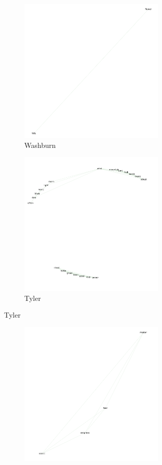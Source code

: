 \documentclass[12pt]{article}
\begin{document}
\begin{flushleft}
\begin{spacing}{2.0}
\begin{figure}
	\begin{subfigure}{\linewidth}
		\begin{subfigure}{.5\linewidth}
	  		\includegraphics[width=3in]{washburn-no-womenwords.png}\hfill
	  		\caption{Washburn}
	  	\end{subfigure}
	  	\begin{subfigure}{.5\linewidth}
	  		\includegraphics[width=3in]{tyler-no-womenwords.png}
	  		\caption{Tyler}
	  	\end{subfigure}
	\end{subfigure}\par\medskip
	\begin{subfigure}{\linewidth}
		\begin{subfigure}{.5\linewidth}
			\includegraphics[width=3in]{seidensticker-no-womenwords.png}\hfill

\end{subfigure}
\end{subfigure}
\end{figure}
\end{spacing}
\end{flushleft}
\end{document}
